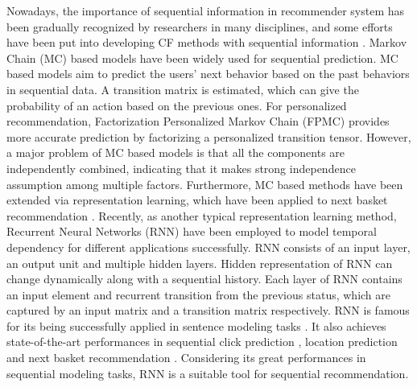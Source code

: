 \documentclass{sig-alternate}
\begin{document}
Nowadays, the importance of sequential information in recommender system has been gradually recognized by researchers in many disciplines, and some efforts have been put into developing CF methods with sequential information \cite{campos2014time}. Markov Chain (MC) based models \cite{yang2010personalizing,rendle2010factorizing,natarajan2013app,chen2015personalized} have been widely used for sequential prediction. MC based models aim to predict the users' next behavior based on the past behaviors in sequential data. A transition matrix is estimated, which can give the probability of an action based on the previous ones. For personalized recommendation, Factorization Personalized Markov Chain (FPMC) \cite{rendle2010factorizing} provides more accurate prediction by factorizing a personalized transition tensor. However, a major problem of MC based models is that all the components are independently combined, indicating that it makes strong independence assumption among multiple factors. Furthermore, MC based methods have been extended via representation learning, which have been applied to next basket recommendation \cite{wang2015learning}. Recently, as another typical representation learning method, Recurrent Neural Networks (RNN) have been employed to model temporal dependency for different applications successfully. RNN consists of an input layer, an output unit and multiple hidden layers. Hidden representation of RNN can change dynamically along with a sequential history. Each layer of RNN contains an input element and recurrent transition from the previous status, which are captured by an input matrix and a transition matrix respectively. RNN is famous for its being successfully applied in sentence modeling tasks \cite{mikolov2010recurrent,mikolov2011extensions,mikolov2011rnnlm}. It also achieves state-of-the-art performances in sequential click prediction \cite{zhang2014sequential}, location prediction \cite{liu2016strnn} and next basket recommendation \cite{yu2016dream}. Considering its great performances in sequential modeling tasks, RNN is a suitable tool for sequential recommendation.
\end{document}
